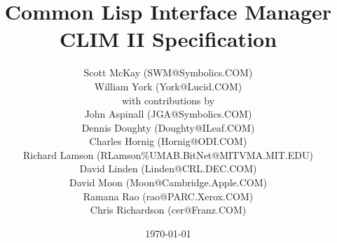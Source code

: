 
\pagestyle{headings}

\title{Common Lisp Interface Manager \\
       CLIM II Specification}

\author{Scott McKay ({\tentt SWM@Symbolics.COM}) \\
        William York ({\tentt York@Lucid.COM}) \\ 
        {\tenit with contributions by} \\
        {\tenrm John Aspinall ({\tentt JGA@Symbolics.COM})} \\
        {\tenrm Dennis Doughty ({\tentt Doughty@ILeaf.COM})} \\
        {\tenrm Charles Hornig ({\tentt Hornig@ODI.COM})} \\
        {\tenrm Richard Lamson ({\tentt RLamson\%UMAB.BitNet@MITVMA.MIT.EDU})} \\
        {\tenrm David Linden ({\tentt Linden@CRL.DEC.COM})} \\
        {\tenrm David Moon ({\tentt Moon@Cambridge.Apple.COM})} \\
        {\tenrm Ramana Rao ({\tentt rao@PARC.Xerox.COM})} \\
        {\tenrm Chris Richardson ({\tentt cer@Franz.COM})}}

\date{\today}

\makeindex




\newif \ifpsfig \psfigfalse

\addtolength{\oddsidemargin}{-.5in}
\addtolength{\evensidemargin}{-.5in}
\addtolength{\textwidth}{1in}
\addtolength{\topmargin}{-.5in}
\addtolength{\textheight}{1.0in}



\maketitle

\parindent 0pc
\parskip   1pc

\renewcommand{\thepage}{\roman{page}}

\pagebreak
\tableofcontents

\pagebreak


